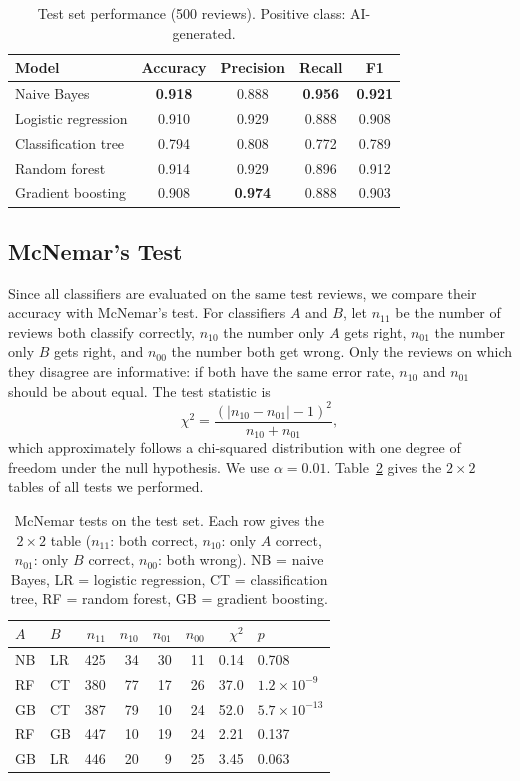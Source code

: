 \documentclass{article}
\begin{document}
\begin{table}[H]
\centering
\small
\caption{Test set performance (500 reviews). Positive class: AI-generated.}
\label{tab:performance}
\begin{tabular}{lcccc}
\hline
Model & Accuracy & Precision & Recall & F1 \\
\hline
Naive Bayes         & \textbf{0.918} & 0.888 & \textbf{0.956} & \textbf{0.921} \\
Logistic regression & 0.910 & 0.929 & 0.888 & 0.908 \\
Classification tree & 0.794 & 0.808 & 0.772 & 0.789 \\
Random forest       & 0.914 & 0.929 & 0.896 & 0.912 \\
Gradient boosting   & 0.908 & \textbf{0.974} & 0.888 & 0.903 \\
\hline
\end{tabular}
\end{table}

\subsection{McNemar's Test}

Since all classifiers are evaluated on the same test reviews, we compare their accuracy with McNemar's test. For classifiers $A$ and $B$, let $n_{11}$ be the number of reviews both classify correctly, $n_{10}$ the number only $A$ gets right, $n_{01}$ the number only $B$ gets right, and $n_{00}$ the number both get wrong. Only the reviews on which they disagree are informative: if both have the same error rate, $n_{10}$ and $n_{01}$ should be about equal. The test statistic is
\[
\chi^2 = \frac{(|n_{10} - n_{01}| - 1)^2}{n_{10} + n_{01}},
\]
which approximately follows a chi-squared distribution with one degree of freedom under the null hypothesis. We use $\alpha = 0.01$. Table~\ref{tab:mcnemar} gives the $2 \times 2$ tables of all tests we performed.

\begin{table}[H]
\centering
\small
\caption{McNemar tests on the test set. Each row gives the $2\times2$ table
($n_{11}$: both correct, $n_{10}$: only $A$ correct, $n_{01}$: only $B$
correct, $n_{00}$: both wrong). NB = naive Bayes, LR = logistic regression,
CT = classification tree, RF = random forest, GB = gradient boosting.}
\label{tab:mcnemar}
\begin{tabular}{llrrrrrl}
\hline
$A$ & $B$ & $n_{11}$ & $n_{10}$ & $n_{01}$ & $n_{00}$ & $\chi^2$ & $p$ \\
\hline

NB & LR & 425 & 34 & 30 & 11 & 0.14 & 0.708 \\
RF & CT & 380 & 77 & 17 & 26 & 37.0 & $1.2 \times 10^{-9}$ \\
GB & CT & 387 & 79 & 10 & 24 & 52.0 & $5.7 \times 10^{-13}$ \\
RF & GB & 447 & 10 & 19 & 24 & 2.21 & 0.137 \\
GB & LR & 446 & 20 &  9 & 25 & 3.45 & 0.063 \\
\hline
\end{tabular}
\end{table}
\end{document}
